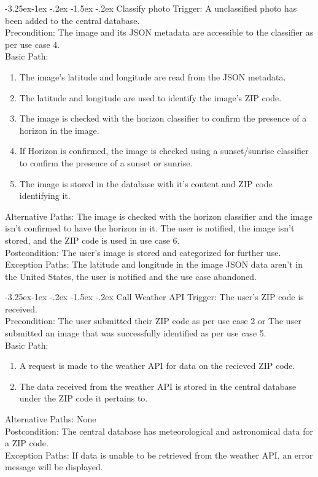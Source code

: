 \documentclass[journal,10pt,draftclsnofoot,onecolumn]{IEEEtran}
\makeatletter
\renewcommand\subsubsection{\@startsection{subsubsection}{3}{\z@}%
                                     {-3.25ex\@plus -1ex \@minus -.2ex}%
                                     {-1.5ex \@plus -.2ex}%
                                     {\normalfont\normalsize\bfseries}}
\makeatother
\begin{document}
\begin{singlespace}
		\subsubsection{Classify photo}
			Trigger: A unclassified photo has been added to the central database.\\
			Precondition: The image and its JSON metadata are accessible to the classifier as per use case 4.\\
			Basic Path:
			\begin{enumerate}
				\item The image's latitude and longitude are read from the JSON metadata.
				\item The latitude and longitude are used to identify the image's ZIP code.
				\item The image is checked with the horizon classifier to confirm the presence of a horizon in the image.
				\item If Horizon is confirmed, the image is checked using a sunset/sunrise classifier to confirm the presence of a sunset or sunrise.
				\item The image is stored in the database with it's content and ZIP code identifying it.
			\end{enumerate}
			Alternative Paths: The image is checked with the horizon classifier and the image isn't confirmed to have the horizon in it. The user is notified, the image isn't stored, and the ZIP code is used in use case 6.\\
			Postcondition: The user's image is stored and categorized for further use.\\
			Exception Paths: The latitude and longitude in the image JSON data aren't in the United States, the user is notified and the use case abandoned.
		
		\subsubsection{Call Weather API}
			Trigger: The user's ZIP code is received.\\
			Precondition: The user submitted their ZIP code as per use case 2 or The user submitted an image that was successfully identified as per use case 5.\\
			Basic Path:
			\begin{enumerate}
				\item A request is made to the weather API for data on the recieved ZIP code.
				\item The data received from the weather API is stored in the central database under the ZIP code it pertains to.
			\end{enumerate}
			Alternative Paths: None\\
			Postcondition: The central database has meteorological and astronomical data for a ZIP code.\\
			Exception Paths: If data is unable to be retrieved from the weather API, an error message will be displayed.
		

\end{singlespace}
\end{document}
